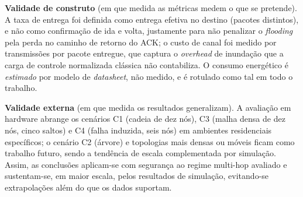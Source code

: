 \textbf{Validade de construto} (em que medida as métricas medem o que se
pretende). A taxa de entrega foi definida como entrega efetiva no destino
(pacotes distintos), e não como confirmação de ida e volta, justamente
para não penalizar o \emph{flooding} pela perda no caminho de retorno do
ACK; o custo de canal foi medido por transmissões por pacote entregue,
que captura o \emph{overhead} de inundação que a carga de controle
normalizada clássica não contabiliza. O consumo energético é
\emph{estimado} por modelo de \emph{datasheet}, não medido, e é rotulado
como tal em todo o trabalho.

\textbf{Validade externa} (em que medida os resultados generalizam). A
avaliação em hardware abrange os cenários C1 (cadeia de dez nós), C3 (malha
densa de dez nós, cinco saltos) e C4 (falha induzida, seis nós) em ambientes
residenciais específicos; o cenário C2 (árvore) e topologias mais densas ou
móveis ficam como trabalho futuro, sendo a tendência de escala complementada
por simulação. Assim, as
conclusões aplicam-se com segurança ao regime multi-hop avaliado e
sustentam-se, em maior escala, pelos resultados de simulação, evitando-se
extrapolações além do que os dados suportam.
